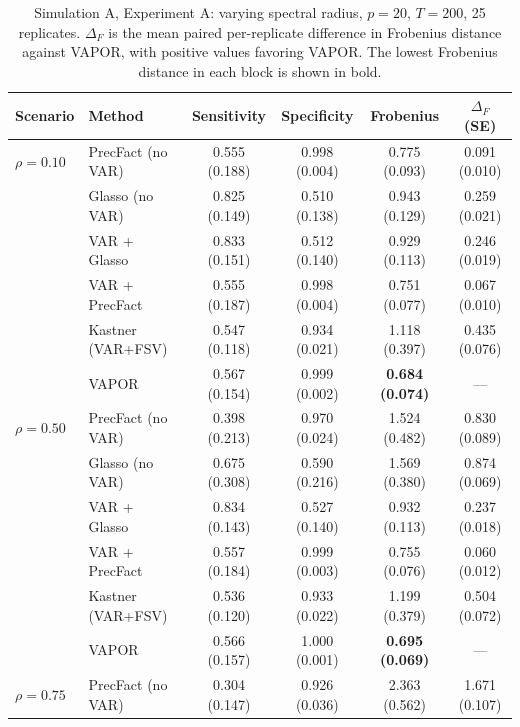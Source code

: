 
\begin{table}[h!]
\centering
\small
\setlength{\tabcolsep}{4pt}
\caption{Simulation A, Experiment A: varying spectral radius, $p=20$, $T=200$, 25 replicates. $\Delta_F$ is the mean paired per-replicate difference in Frobenius distance against VAPOR, with positive values favoring VAPOR. The lowest Frobenius distance in each block is shown in bold.}
\label{tab:sim-a-autocorr}
\begin{tabular}{llcccc}
\toprule
Scenario & Method & Sensitivity & Specificity & Frobenius & $\Delta_F$ (SE) \\
\midrule
$\rho = 0.10$ & PrecFact (no VAR)  & 0.555 (0.188) & 0.998 (0.004) & 0.775 (0.093) & 0.091 (0.010) \\
              & Glasso (no VAR)    & 0.825 (0.149) & 0.510 (0.138) & 0.943 (0.129) & 0.259 (0.021) \\
              & VAR + Glasso       & 0.833 (0.151) & 0.512 (0.140) & 0.929 (0.113) & 0.246 (0.019) \\
              & VAR + PrecFact     & 0.555 (0.187) & 0.998 (0.004) & 0.751 (0.077) & 0.067 (0.010) \\
              & Kastner (VAR+FSV)  & 0.547 (0.118) & 0.934 (0.021) & 1.118 (0.397) & 0.435 (0.076) \\
              & VAPOR              & 0.567 (0.154) & 0.999 (0.002) & \textbf{0.684 (0.074)} & --- \\
\midrule
$\rho = 0.50$ & PrecFact (no VAR)  & 0.398 (0.213) & 0.970 (0.024) & 1.524 (0.482) & 0.830 (0.089) \\
              & Glasso (no VAR)    & 0.675 (0.308) & 0.590 (0.216) & 1.569 (0.380) & 0.874 (0.069) \\
              & VAR + Glasso       & 0.834 (0.143) & 0.527 (0.140) & 0.932 (0.113) & 0.237 (0.018) \\
              & VAR + PrecFact     & 0.557 (0.184) & 0.999 (0.003) & 0.755 (0.076) & 0.060 (0.012) \\
              & Kastner (VAR+FSV)  & 0.536 (0.120) & 0.933 (0.022) & 1.199 (0.379) & 0.504 (0.072) \\
              & VAPOR              & 0.566 (0.157) & 1.000 (0.001) & \textbf{0.695 (0.069)} & --- \\
\midrule
$\rho = 0.75$ & PrecFact (no VAR)  & 0.304 (0.147) & 0.926 (0.036) & 2.363 (0.562) & 1.671 (0.107) \\

\end{tabular}
\end{table}
